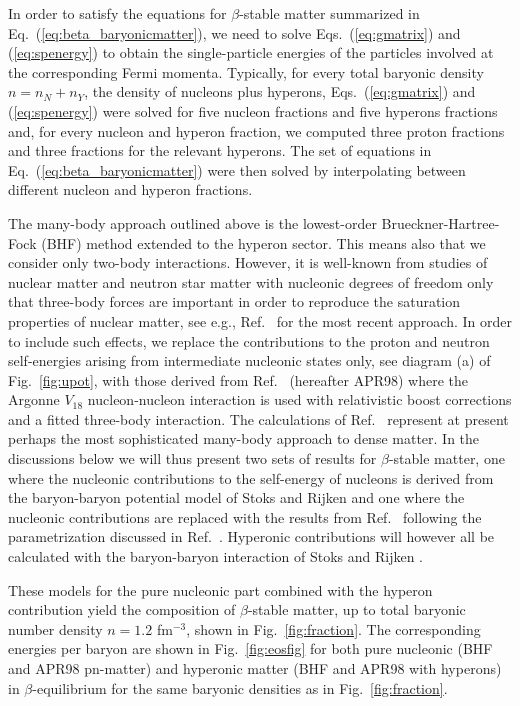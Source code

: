 \begin{multicols}{2}
In order to satisfy the equations for $\beta$-stable matter summarized
in Eq.\ (\ref{eq:beta_baryonicmatter}), we need to solve 
Eqs.\ (\ref{eq:gmatrix}) and (\ref{eq:spenergy}) to obtain 
the single-particle energies of the
particles involved at the corresponding Fermi momenta.
Typically, for every total 
baryonic density $n=n_N+n_Y$, the density of nucleons plus hyperons,
Eqs.\ (\ref{eq:gmatrix}) and (\ref{eq:spenergy}) were solved for five nucleon
fractions and five hyperons fractions and,  for every nucleon and hyperon
fraction, we computed
three proton fractions and three fractions for the relevant hyperons.
The set of equations in Eq.\  (\ref{eq:beta_baryonicmatter}) were
then solved by interpolating between different nucleon and hyperon 
fractions.

The many-body approach outlined above is the lowest-order
Brueckner-Hartree-Fock (BHF) method extended to the hyperon sector. 
This means also that we consider only
two-body interactions. However, it is well-known from studies of nuclear
matter and neutron star matter with nucleonic degrees of freedom only
that three-body forces are important in order to reproduce the saturation 
properties of nuclear matter, see e.g., Ref.\ \cite{apr98} for the most recent
approach.  In order to include such effects, we replace the contributions
to the proton and neutron self-energies arising from intermediate 
nucleonic states only, see diagram (a) of Fig.\ \ref{fig:upot},
with those derived from Ref.\ \cite{apr98} (hereafter APR98) 
where the Argonne $V_{18}$ nucleon-nucleon interaction \cite{v18} is used with
relativistic boost corrections and a fitted three-body interaction. 
The calculations of Ref.\ \cite{apr98} represent at present perhaps
the most sophisticated many-body approach to dense matter. 
In the discussions below we will thus present two sets of results for 
$\beta$-stable matter, one where the nucleonic contributions
to the self-energy of nucleons is derived from the baryon-baryon potential
model of Stoks  and Rijken \cite{sr99} and one where the nucleonic contributions
are replaced with the results from Ref.\ \cite{apr98} following the parametrization
discussed in Ref.\ \cite{hh99}. Hyperonic contributions
will however all be calculated with the baryon-baryon interaction of 
Stoks  and Rijken \cite{sr99}.

These models for the pure nucleonic part combined with the hyperon 
contribution yield
the composition of $\beta$-stable matter, up to total baryonic number density  
$n=1.2$ fm$^{-3}$, shown in Fig.\ 
\ref{fig:fraction}. 
The corresponding energies per baryon  
are shown in Fig.\ \ref{fig:eosfig} for both pure nucleonic
(BHF and APR98 pn-matter) 
and hyperonic matter (BHF and APR98 with hyperons) in $\beta$-equilibrium
for the same baryonic densities as in Fig.\ \ref{fig:fraction}.


\end{multicols}

